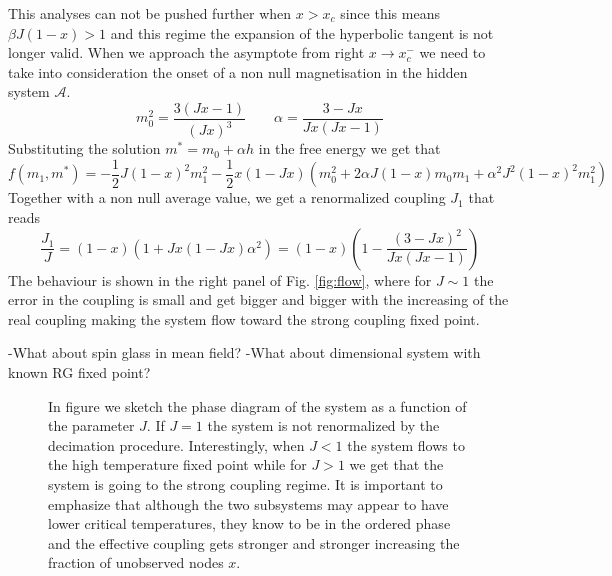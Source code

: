 \documentclass[aps,pre,noshowpacs]{revtex4}
\begin{document}
This analyses can not be pushed further when $x>x_c$ since this means $\beta J(1-x)>1$ and this regime the expansion of the hyperbolic tangent is not longer valid. When we approach the asymptote from right $x \to x_c^-$ we need to take into consideration the onset of a non null magnetisation in the hidden system $\mathcal{A}$.
\begin{equation}
m_0^2= \frac{3(Jx-1)}{(Jx)^3} \qquad \alpha=\frac{3-Jx}{Jx (Jx-1)}
\end{equation}
Substituting the solution $m^*=m_0+\alpha h$ in the free energy we get that
\begin{equation}
f(m_1,m^*)=-\frac{1}{2} J(1-x)^2 m_1^2 - \frac{1}{2} x(1-Jx) (m_0^2+2 \alpha J(1-x) m_0 m_1 + \alpha^2 J^2 (1-x)^2 m_1^2)
\end{equation}
Together with a non null average value, we get a renormalized coupling $J_1$ that reads
\begin{equation}
\frac{J_1}{J}= (1-x) \left( 1+ J x (1-Jx)\alpha^2 \right)= (1-x) \left( 1- \frac{(3-Jx)^2}{Jx(Jx-1)}\right)
\end{equation}
The behaviour is shown in the right panel of Fig. \ref{fig:flow}, where for $J\sim 1$ the error in the coupling is small and get bigger and bigger with the increasing of the real coupling making the system flow toward the strong coupling fixed point.

-What about spin glass in mean field?
-What about dimensional system with known RG fixed point?
\begin{figure}[h]
\caption{In figure we sketch the phase diagram of the system as a function of the parameter $J$. If $J=1$ the system is not renormalized by the decimation procedure. Interestingly, when $J<1$ the system flows to the high temperature fixed point while
for $J>1$ we get that the system is going to the strong coupling regime. It is important to emphasize that although the two subsystems may appear to have lower critical temperatures, they know to be in the ordered phase and the effective coupling gets stronger and stronger increasing the fraction of unobserved nodes $x$.}
\end{figure} 
\end{document}
